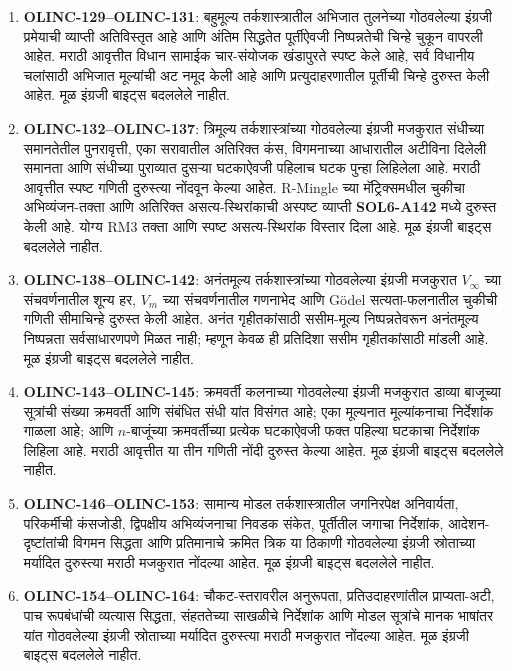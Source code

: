 \begin{enumerate}
\item \textbf{OLINC-129--OLINC-131}: बहुमूल्य तर्कशास्त्रातील
अभिजात तुलनेच्या गोठवलेल्या इंग्रजी प्रमेयाची व्याप्ती
अतिविस्तृत आहे आणि अंतिम सिद्धतेत पूर्तीऐवजी निष्पन्नतेची
चिन्हे चुकून वापरली आहेत. मराठी आवृत्तीत विधान सामाईक
चार-संयोजक खंडापुरते स्पष्ट केले आहे, सर्व विधानीय चलांसाठी
अभिजात मूल्यांची अट नमूद केली आहे आणि प्रत्युदाहरणातील
पूर्तीची चिन्हे दुरुस्त केली आहेत. मूळ इंग्रजी बाइट्स बदललेले नाहीत.

\item \textbf{OLINC-132--OLINC-137}: त्रिमूल्य तर्कशास्त्रांच्या
गोठवलेल्या इंग्रजी मजकुरात संधीच्या समानतेतील पुनरावृत्ती,
एका सरावातील अतिरिक्त कंस, विगमनाच्या आधारातील अटीविना
दिलेली समानता आणि संधीच्या पुराव्यात दुसऱ्या घटकाऐवजी
पहिलाच घटक पुन्हा लिहिलेला आहे. मराठी आवृत्तीत स्पष्ट
गणिती दुरुस्त्या नोंदवून केल्या आहेत. R-Mingle च्या
मॅट्रिक्समधील चुकीचा अभिव्यंजन-तक्ता आणि अतिरिक्त
असत्य-स्थिरांकाची अस्पष्ट व्याप्ती \textbf{SOL6-A142}
मध्ये दुरुस्त केली आहे. योग्य RM3 तक्ता आणि स्पष्ट
असत्य-स्थिरांक विस्तार दिला आहे. मूळ इंग्रजी
बाइट्स बदललेले नाहीत.

\item \textbf{OLINC-138--OLINC-142}: अनंतमूल्य तर्कशास्त्रांच्या
गोठवलेल्या इंग्रजी मजकुरात $V_\infty$ च्या संचवर्णनातील
शून्य हर, $V_m$ च्या संचवर्णनातील गणनाभेद आणि G\"odel
सत्यता-फलनातील चुकीची गणिती सीमाचिन्हे दुरुस्त केली आहेत.
अनंत गृहीतकांसाठी ससीम-मूल्य निष्पन्नतेवरून अनंतमूल्य
निष्पन्नता सर्वसाधारणपणे मिळत नाही; म्हणून केवळ ही
प्रतिदिशा ससीम गृहीतकांसाठी मांडली आहे. मूळ
इंग्रजी बाइट्स बदललेले नाहीत.

\item \textbf{OLINC-143--OLINC-145}: क्रमवर्ती कलनाच्या
गोठवलेल्या इंग्रजी मजकुरात डाव्या बाजूच्या सूत्रांची संख्या
क्रमवर्ती आणि संबंधित संधी यांत विसंगत आहे; एका
मूल्यनात मूल्यांकनाचा निर्देशांक गाळला आहे; आणि
$n$-बाजूंच्या क्रमवर्तीच्या प्रत्येक घटकाऐवजी फक्त
पहिल्या घटकाचा निर्देशांक लिहिला आहे. मराठी आवृत्तीत
या तीन गणिती नोंदी दुरुस्त केल्या आहेत. मूळ इंग्रजी
बाइट्स बदललेले नाहीत.

\item \textbf{OLINC-146--OLINC-153}: सामान्य मोडल
तर्कशास्त्रातील जगनिरपेक्ष अनिवार्यता, परिकर्मीची
कंसजोडी, द्विपक्षीय अभिव्यंजनाचा निवडक संकेत,
पूर्तीतील जगाचा निर्देशांक, आदेशन-दृष्टांतांची विगमन
सिद्धता आणि प्रतिमानाचे क्रमित त्रिक या ठिकाणी
गोठवलेल्या इंग्रजी स्रोताच्या मर्यादित दुरुस्त्या
मराठी मजकुरात नोंदल्या आहेत. मूळ इंग्रजी बाइट्स
बदललेले नाहीत.

\item \textbf{OLINC-154--OLINC-164}: चौकट-स्तरावरील
अनुरूपता, प्रतिउदाहरणांतील प्राप्यता-अटी, पाच रूपबंधांची
व्यत्यास सिद्धता, संहततेच्या साखळीचे निर्देशांक आणि
मोडल सूत्रांचे मानक भाषांतर यांत गोठवलेल्या इंग्रजी
स्रोताच्या मर्यादित दुरुस्त्या मराठी मजकुरात नोंदल्या
आहेत. मूळ इंग्रजी बाइट्स बदललेले नाहीत.


\end{enumerate}
